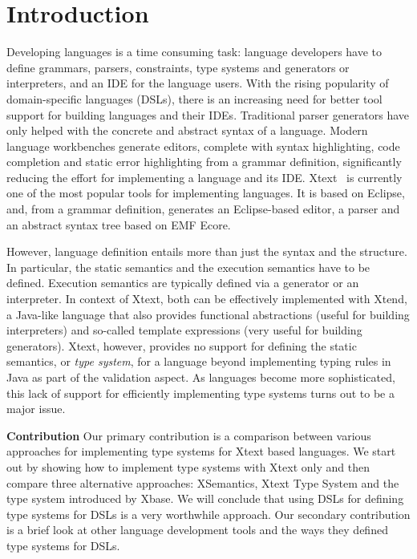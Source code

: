 \section{Introduction}
\label{sec:introduction}
 
Developing languages is a time consuming task: language developers have to
define grammars, parsers, constraints, type systems and generators or
interpreters, and an IDE for the language users. With the rising popularity of
domain-specific languages (DSLs), there is an increasing need for better tool
support for building languages and their IDEs. Traditional parser generators
have only helped with the concrete and abstract syntax of a language. Modern
language workbenches generate editors, complete with syntax highlighting, code
completion and static error highlighting from a grammar definition,
significantly reducing the effort for implementing a language and its IDE.
Xtext~\cite{xtext} is currently one of the most popular tools for implementing
languages.
It is based on Eclipse, and, from a grammar definition, generates an
Eclipse-based editor, a parser and an abstract syntax tree based on EMF
Ecore.

However, language definition entails more than just the syntax and the
structure. In particular, the static semantics and the execution semantics have
to be defined. Execution semantics are typically defined via a generator or an
interpreter. In context of Xtext, both can be effectively implemented with
Xtend, a Java-like language that also provides functional abstractions (useful
for building interpreters) and so-called template expressions (very useful for
building generators). Xtext, however, provides no support for defining the
static semantics, or \emph{type system}, for a language beyond implementing
typing rules in Java as part of the validation aspect. As languages become more
sophisticated, this lack of support for efficiently implementing type systems
turns out to be a major issue.


\textbf{Contribution} Our primary contribution is a comparison between various
approaches for implementing type systems for Xtext based languages. We start out
by showing how to implement type systems with Xtext only and then compare three
alternative approaches: XSemantics, Xtext Type System and the type system introduced 
by Xbase. We will conclude that using DSLs for defining type systems for DSLs is
a very worthwhile approach. Our secondary contribution is a brief look
at other language development tools and the ways they defined type systems for
DSLs.

